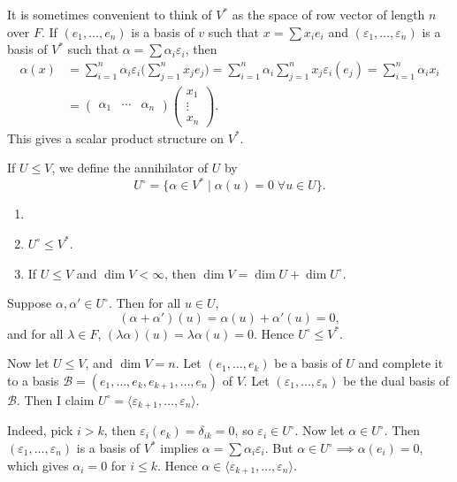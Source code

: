 \documentclass[12pt]{article}
\begin{document}
\begin{remark}
	It is sometimes convenient to think of $V^{\ast}$ as the space of row vector of length $n$ over $F$. If $(e_1, \ldots, e_n)$ is a basis of $v$ such that $x = \sum x_i e_i$ and $(\varepsilon_1, \ldots, \varepsilon_n)$ is a basis of $V^{\ast}$ such that $\alpha = \sum \alpha_i \varepsilon_i$, then
	\begin{align*}
		\alpha(x) &= \sum_{i = 1}^{n} \alpha_i \varepsilon_i \Biggl( \sum_{j = 1}^{n} x_j e_j \Biggr) = \sum_{i = 1}^{n} \alpha_i \sum_{j = 1}^{n} x_j \varepsilon_i(e_j) = \sum_{i = 1}^{n} \alpha_i x_i \\
			  &= 
			  \begin{pmatrix}
				  \alpha_1 & \cdots & \alpha_n
			  \end{pmatrix}
			  \begin{pmatrix}
			  	x_1 \\
				\vdots \\
				x_n
			  \end{pmatrix}.
	\end{align*}
	This gives a scalar product structure on $V^{\ast}$.
\end{remark}

\begin{definition}
	If $U \leq V$, we define the annihilator of $U$ by
	\[
		U^{\circ} = \{\alpha \in V^{\ast} \mid \alpha(u) = 0 \; \forall u \in U\}
	.\]
\end{definition}

\begin{lemma}
	\begin{enumerate}[\normalfont(i)]
		\item[]
		\item $U^{\circ} \le V^{\ast}$.
		\item If $U \leq V$ and $\dim V < \infty$, then $\dim V = \dim U + \dim U^{\circ}$.
	\end{enumerate}
\end{lemma}

\begin{proofbox}
	Suppose $\alpha, \alpha' \in U^{\circ}$. Then for all $u \in U$,
	\[
		(\alpha + \alpha')(u) = \alpha(u) + \alpha'(u) = 0
	,\]
	and for all $\lambda \in F$, $(\lambda \alpha)(u) = \lambda \alpha(u) = 0$. Hence $U^{\circ} \le V^{\ast}$.

	Now let $U \leq V$, and $\dim V = n$. Let $(e_1, \ldots, e_k)$ be a basis of $U$ and complete it to a basis $\mathcal{B} = (e_1, \ldots, e_k, e_{k+1}, \ldots, e_n)$ of $V$. Let $(\varepsilon_1, \ldots, \varepsilon_n)$ be the dual basis of $\mathcal{B}$. Then I claim $U^{\circ} = \langle \varepsilon_{k+1}, \ldots, \varepsilon_n\rangle$.

	Indeed, pick $i > k$, then $\varepsilon_i(e_k) = \delta_{ik} = 0$, so $\varepsilon_i \in U^{\circ}$. Now let $\alpha \in U^{\circ}$. Then $(\varepsilon_1, \ldots, \varepsilon_n)$ is a basis of $V^{\ast}$ implies $\alpha = \sum \alpha_i \varepsilon_i$. But $\alpha \in U^{\circ} \implies \alpha(e_i) = 0$, which gives $\alpha_i = 0$ for $i \leq k$. Hence $\alpha \in \langle \varepsilon_{k+1}, \ldots, \varepsilon_n\rangle$.
\end{proofbox}
\end{document}

